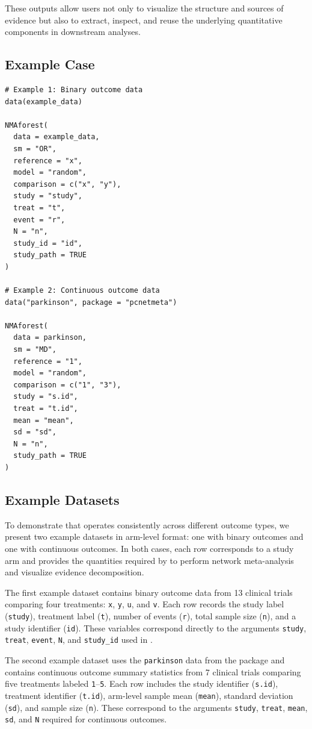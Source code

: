 These outputs allow users not only to visualize the structure and sources of evidence but also to extract, inspect, and reuse the underlying quantitative components in downstream analyses.

\subsection{Example Case}

\begin{verbatim}
# Example 1: Binary outcome data
data(example_data)

NMAforest(
  data = example_data,
  sm = "OR",
  reference = "x",
  model = "random",
  comparison = c("x", "y"),
  study = "study",
  treat = "t",
  event = "r",
  N = "n",
  study_id = "id",
  study_path = TRUE
)

# Example 2: Continuous outcome data
data("parkinson", package = "pcnetmeta")

NMAforest(
  data = parkinson,
  sm = "MD",
  reference = "1",
  model = "random",
  comparison = c("1", "3"),
  study = "s.id",
  treat = "t.id",
  mean = "mean",
  sd = "sd",
  N = "n",
  study_path = TRUE
)
\end{verbatim}

\subsection{Example Datasets}

To demonstrate that  operates consistently across different outcome types, we present two example datasets in arm-level format: one with binary outcomes and one with continuous outcomes. In both cases, each row corresponds to a study arm and provides the quantities required by  to perform network meta-analysis and visualize evidence decomposition.

The first example dataset contains binary outcome data from 13 clinical trials comparing four treatments: \texttt{x}, \texttt{y}, \texttt{u}, and \texttt{v}. Each row records the study label (\texttt{study}), treatment label (\texttt{t}), number of events (\texttt{r}), total sample size (\texttt{n}), and a study identifier (\texttt{id}). These variables correspond directly to the arguments \texttt{study}, \texttt{treat}, \texttt{event}, \texttt{N}, and \texttt{study\_id} used in .

The second example dataset uses the \texttt{parkinson} data from the  package and contains continuous outcome summary statistics from 7 clinical trials comparing five treatments labeled \texttt{1}--\texttt{5}. Each row includes the study identifier (\texttt{s.id}), treatment identifier (\texttt{t.id}), arm-level sample mean (\texttt{mean}), standard deviation (\texttt{sd}), and sample size (\texttt{n}). These correspond to the arguments \texttt{study}, \texttt{treat}, \texttt{mean}, \texttt{sd}, and \texttt{N} required for continuous outcomes. 


